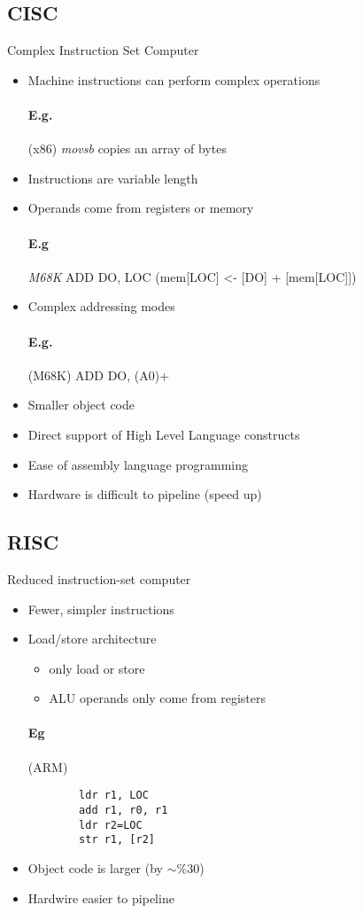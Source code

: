     \subsection{CISC} Complex Instruction Set Computer\\
      \begin{itemize}
        \item Machine instructions can perform complex operations
        \paragraph{E.g.} (x86) \textit{movsb} copies an array of bytes
        \item Instructions are variable length
        \item Operands come from registers or memory
        \paragraph{E.g} \textit{M68K} ADD DO, LOC (mem[LOC] \textless- [DO] +
        [mem[LOC]])
        \item Complex addressing modes
        \paragraph{E.g.} (M68K) ADD DO, (A0)+
        \item Smaller object code
        \item Direct support of High Level Language constructs
        \item Ease of assembly language programming
        \item Hardware is difficult to pipeline (speed up)
      \end{itemize}

    \subsection{RISC}
      Reduced instruction-set computer
      \begin{itemize}
        \item Fewer, simpler instructions
        \item Load/store architecture
        \begin{itemize}
          \item only load or store
          \item ALU operands only come from registers
        \end{itemize}
      \paragraph{Eg} (ARM)
      \begin{lstlisting}
        ldr r1, LOC
        add r1, r0, r1
        ldr r2=LOC
        str r1, [r2]
      \end{lstlisting}
      \item Object code is larger (by $\sim$\%30)
      \item Hardwire easier to pipeline
      \end{itemize}


